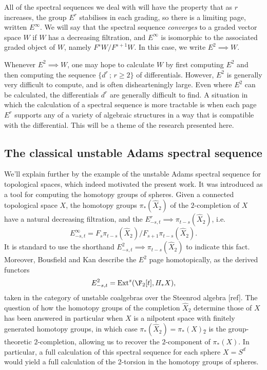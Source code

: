 \documentclass[11pt]{article}
\begin{document}
All of the spectral sequences we deal with will have the property that as $r$ increases, the group $E^r$ stabilises in each grading, so there is a limiting page, written $E^\infty$. We will say that the spectral sequence \emph{converges} to a graded vector space $W$ if $W$ has a decreasing filtration, and $E^\infty$ is isomorphic to the associated graded object of $W$, namely $F^sW/F^{s+1}W$. In this case, we write $E^2\implies W$.

Whenever $E^2\implies W$, one may hope to calculate $W$ by first computing $E^2$ and then computing the sequence $\{d^r\,;\,r\geq2\}$ of differentials. However, $E^2$ is generally very difficult to compute, and is often dishearteningly large. Even where $E^2$ can be calculated, the differentials $d^r$ are generally difficult to find.
A situation in which the calculation of a spectral sequence is more tractable is when each page $E^r$ supports any of a variety of algebraic structures in a way that is compatible with the differential. This will be a theme of the research presented here.

\subsection*{The classical unstable Adams spectral sequence}
We'll explain further by the example of the unstable Adams spectral sequence for topological spaces, which indeed motivated the present work. It was introduced as a tool for computing the homotopy groups of spheres. Given a connected topological space $X$, the homotopy groups $\pi_*(\hat X_2)$ of the $2$-completion of $X$ have a natural decreasing filtration, and the $E^r_{-s,t}\implies \pi_{t-s}(\hat X_2)$, i.e.\ 
\[E^\infty_{-s,t}=F_s\pi_{t-s}(\hat X_2)/F_{s+1}\pi_{t-s}(\hat X_2).\]
It is standard to use the shorthand $E^2_{-s,t}\implies \pi_{t-s}(\hat X_2)$ to indicate this fact. Moreover, Bousfield and Kan describe the $E^2$ page homotopically, as the derived functors
\[E^2_{-s,t}=\Ext^s(\F_2[t],H_*X),\]
taken in the category of unstable coalgebras over the Steenrod algebra [ref]. The question of how the homotopy groups of the completion $\hat X_2$ determine those of $X$ has been answered in particular when $X$ is a nilpotent space with finitely generated homotopy groups, in which case $\pi_*(\hat X_2)=\pi_*(X)\hat{_2}$ is the group-theoretic $2$-completion, allowing us to recover the $2$-component of $\pi_*(X)$. In particular, a full calculation of this spectral sequence for each sphere $X=S^d$ would yield a full calculation of the 2-torsion in the homotopy groups of spheres.
\end{document}
